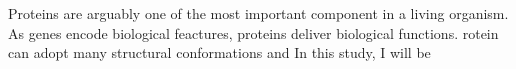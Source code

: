 Proteins are arguably one of the most important component in a living organism. As genes encode biological feactures, proteins deliver biological functions. rotein can adopt many structural conformations and   In this study, I will be 